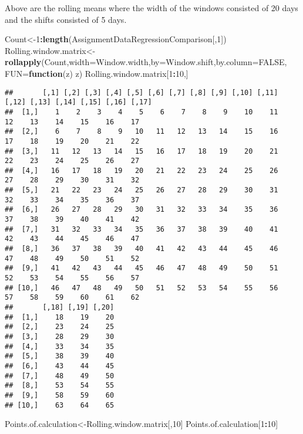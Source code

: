 \documentclass[]{article}
\newenvironment{Shaded}{\begin{snugshade}}{\end{snugshade}}
\newcommand{\KeywordTok}[1]{\textcolor[rgb]{0.13,0.29,0.53}{\textbf{#1}}}
\newcommand{\DataTypeTok}[1]{\textcolor[rgb]{0.13,0.29,0.53}{#1}}
\newcommand{\DecValTok}[1]{\textcolor[rgb]{0.00,0.00,0.81}{#1}}
\newcommand{\OtherTok}[1]{\textcolor[rgb]{0.56,0.35,0.01}{#1}}
\newcommand{\ControlFlowTok}[1]{\textcolor[rgb]{0.13,0.29,0.53}{\textbf{#1}}}
\newcommand{\OperatorTok}[1]{\textcolor[rgb]{0.81,0.36,0.00}{\textbf{#1}}}
\newcommand{\NormalTok}[1]{#1}
\begin{document}
Above are the rolling means where the width of the windows consisted of
20 days and the shifts consisted of 5 days.

\begin{Shaded}
\begin{Highlighting}[]
\NormalTok{Count<-}\DecValTok{1}\OperatorTok{:}\KeywordTok{length}\NormalTok{(AssignmentDataRegressionComparison[,}\DecValTok{1}\NormalTok{])}
\NormalTok{Rolling.window.matrix<-}\KeywordTok{rollapply}\NormalTok{(Count,}\DataTypeTok{width=}\NormalTok{Window.width,}\DataTypeTok{by=}\NormalTok{Window.shift,}\DataTypeTok{by.column=}\OtherTok{FALSE}\NormalTok{,}
          \DataTypeTok{FUN=}\ControlFlowTok{function}\NormalTok{(z) z)}
\NormalTok{Rolling.window.matrix[}\DecValTok{1}\OperatorTok{:}\DecValTok{10}\NormalTok{,]}
\end{Highlighting}
\end{Shaded}

\begin{verbatim}
##       [,1] [,2] [,3] [,4] [,5] [,6] [,7] [,8] [,9] [,10] [,11] [,12] [,13] [,14] [,15] [,16] [,17]
##  [1,]    1    2    3    4    5    6    7    8    9    10    11    12    13    14    15    16    17
##  [2,]    6    7    8    9   10   11   12   13   14    15    16    17    18    19    20    21    22
##  [3,]   11   12   13   14   15   16   17   18   19    20    21    22    23    24    25    26    27
##  [4,]   16   17   18   19   20   21   22   23   24    25    26    27    28    29    30    31    32
##  [5,]   21   22   23   24   25   26   27   28   29    30    31    32    33    34    35    36    37
##  [6,]   26   27   28   29   30   31   32   33   34    35    36    37    38    39    40    41    42
##  [7,]   31   32   33   34   35   36   37   38   39    40    41    42    43    44    45    46    47
##  [8,]   36   37   38   39   40   41   42   43   44    45    46    47    48    49    50    51    52
##  [9,]   41   42   43   44   45   46   47   48   49    50    51    52    53    54    55    56    57
## [10,]   46   47   48   49   50   51   52   53   54    55    56    57    58    59    60    61    62
##       [,18] [,19] [,20]
##  [1,]    18    19    20
##  [2,]    23    24    25
##  [3,]    28    29    30
##  [4,]    33    34    35
##  [5,]    38    39    40
##  [6,]    43    44    45
##  [7,]    48    49    50
##  [8,]    53    54    55
##  [9,]    58    59    60
## [10,]    63    64    65
\end{verbatim}

\begin{Shaded}
\begin{Highlighting}[]
\NormalTok{Points.of.calculation<-Rolling.window.matrix[,}\DecValTok{10}\NormalTok{]}
\NormalTok{Points.of.calculation[}\DecValTok{1}\OperatorTok{:}\DecValTok{10}\NormalTok{]}
\end{Highlighting}
\end{Shaded}
\end{document}
